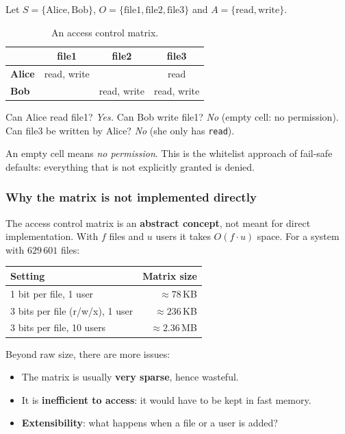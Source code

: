 \begin{example}
Let $S = \{\text{Alice}, \text{Bob}\}$, $O = \{\text{file1}, \text{file2}, \text{file3}\}$ and $A = \{\text{read}, \text{write}\}$.

\begin{table}[h]
\centering
\begin{tabular}{@{}lccc@{}}
\toprule
 & \textbf{file1} & \textbf{file2} & \textbf{file3} \\
\midrule
\textbf{Alice} & read, write &  & read \\
\textbf{Bob} &  & read, write & read, write \\
\bottomrule
\end{tabular}
\caption{An access control matrix.}
\end{table}

Can Alice read file1? \emph{Yes.} Can Bob write file1? \emph{No} (empty cell: no permission). Can file3 be written by Alice? \emph{No} (she only has \texttt{read}).
\end{example}

\begin{remark}
An empty cell means \emph{no permission}. This is the whitelist approach of fail-safe defaults: everything that is not explicitly granted is denied.
\end{remark}

\subsubsection{Why the matrix is not implemented directly}

The access control matrix is an \textbf{abstract concept}, not meant for direct implementation. With $f$ files and $u$ users it takes $O(f \cdot u)$ space. For a system with $629\,601$ files:

\begin{table}[h]
\centering
\begin{tabular}{@{}lr@{}}
\toprule
\textbf{Setting} & \textbf{Matrix size} \\
\midrule
1 bit per file, 1 user & $\approx 78$\,KB \\
3 bits per file (r/w/x), 1 user & $\approx 236$\,KB \\
3 bits per file, 10 users & $\approx 2.36$\,MB \\
\bottomrule
\end{tabular}
\end{table}

Beyond raw size, there are more issues:
\begin{itemize}
    \item The matrix is usually \textbf{very sparse}, hence wasteful.
    \item It is \textbf{inefficient to access}: it would have to be kept in fast memory.
    \item \textbf{Extensibility}: what happens when a file or a user is added?
\end{itemize}

